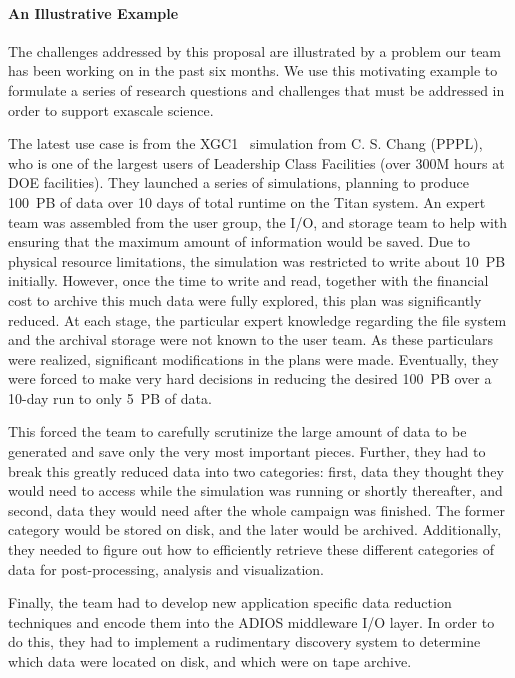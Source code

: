 %
\paragraph{An Illustrative Example}
The challenges addressed by this proposal are illustrated by a problem our team has been working on in the past six months. We use this motivating example to formulate a series of research questions and challenges that must be addressed in order to support exascale science.

The latest use case is from  the XGC1~\cite{chang2006integrated} simulation from C. S. Chang (PPPL), who is one of the largest users of Leadership Class Facilities (over 300M hours at DOE facilities). They launched a series of simulations, planning to produce 100~PB of data over 10 days of total runtime on the Titan system. An expert team was assembled from the user group, the  I/O, and storage  team to help with ensuring that the maximum amount of information would be
saved. Due to physical resource limitations, the simulation was restricted to write about 10~PB initially. However, once the time to write and read, together with the financial cost to archive this much data were fully explored, this plan was significantly reduced. At each stage, the particular expert knowledge regarding the file system and the archival storage were not known to the user team. As these particulars were realized, significant modifications in the plans were made. Eventually, they were forced to make very hard decisions in reducing the desired 100~PB over a 10-day run to only 5~PB of data. 

This forced the team to carefully scrutinize the large amount of data to be generated and save only the very most important pieces. Further, they had to break this greatly reduced data into two categories: first, data they thought they would need to access while the simulation was running or shortly thereafter, and second, data they would need after the whole campaign was finished. The former category would be stored on disk, and the later would be archived. Additionally, they needed to figure out how to efficiently retrieve these different categories of data for post-processing, analysis and visualization.

Finally, the team had to develop new application specific data reduction techniques and encode them into the ADIOS middleware I/O layer. In order to do this, they had to implement a rudimentary discovery system to determine which data were located on disk, and which were on tape archive.  

